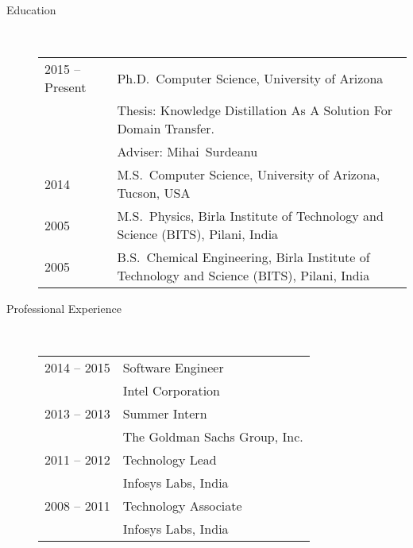 \documentclass[10pt]{article}
\begin{document}
\begin{description}

\item [Education]\

\begin{tabular}{lp{4.5in}}
\hspace{-.2cm}2015 -- Present &  Ph.D.~Computer Science, {\sc University of Arizona}
\\\vspace{.0cm}&Thesis: Knowledge Distillation As A Solution For Domain Transfer. 
\\\vspace{.1cm}& Adviser: Mihai~Surdeanu\\
\vspace{.1cm}\hspace{-.2cm}2014 &  M.S.~Computer Science, {\sc University of Arizona, Tucson, USA} \\
\vspace{.1cm}\hspace{-.2cm}2005 &  M.S.~Physics, {\sc Birla Institute of Technology and Science (BITS), Pilani, India} \\
\hspace{-.2cm}2005 & B.S.~Chemical Engineering,  {\sc Birla Institute of Technology and Science (BITS), Pilani, India}
\end{tabular}


\item [Professional Experience]\

\begin{tabular}{lp{4.9in}}


\hspace{-.2cm}2014 -- 2015 & Software Engineer\\\vspace{.1cm}
& {\sc Intel Corporation} \\

\hspace{-.2cm}2013 -- 2013 & Summer Intern\\\vspace{.1cm}
& {\sc The Goldman Sachs Group, Inc.} \\

\hspace{-.2cm}2011 -- 2012 & Technology Lead\\\vspace{.1cm}
&  {\sc Infosys Labs, India} \\

\hspace{-.2cm}2008 -- 2011 & Technology Associate\\\vspace{.1cm}
& {\sc Infosys Labs, India} \\


\end{tabular}
\end{description}
\end{document}
